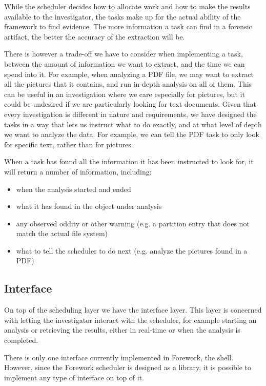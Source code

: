 \documentclass[twoside]{article}
\begin{document}
\begin{multicols}{2}
While the scheduler decides how to allocate work and how to make the results
available to the investigator, the tasks make up for the actual ability of the
framework to find evidence.
The more information a task can find in a forensic artifact, the better the
accuracy of the extraction will be.

There is however a trade-off we have to consider when implementing a task,
between the amount of information we want to extract, and the time we can spend
into it. For example, when analyzing a PDF file, we may want to extract all the
pictures that it contains, and run in-depth analysis on all of them. This can be
useful in an investigation where we care especially for pictures, but it could be
undesired if we are particularly looking for text documents. Given that every
investigation is different in nature and requirements, we have designed the
tasks in a way that lets us instruct what to do exactly, and at what level
of depth we want to analyze the data. For example, we can tell the PDF task to
only look for specific text, rather than for pictures.

When a task has found all the information it has been instructed to look for, it
will return a number of information, including:
\begin{itemize}
    \item when the analysis started and ended
    \item what it has found in the object under analysis
    \item any observed oddity or other warning (e.g. a partition entry that does
        not match the actual file system)
    \item what to tell the scheduler to do next (e.g. analyze the pictures found
        in a PDF)
\end{itemize}


\subsection*{Interface}

On top of the scheduling layer we have the interface layer. This layer is
concerned with letting the investigator interact with the scheduler, for example
starting an analysis or retrieving the results, either in real-time or when the
analysis is completed.

There is only one interface currently implemented in Forework, the shell.
However, since the Forework scheduler is designed as a library, it is possible
to implement any type of interface on top of it.


\end{multicols}
\end{document}

